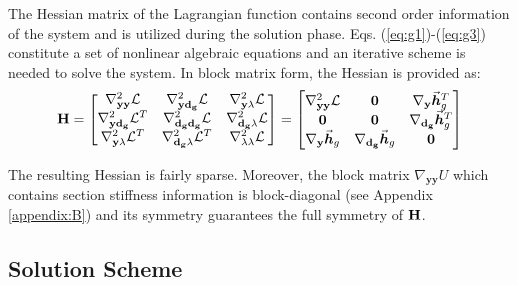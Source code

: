 The Hessian matrix of the Lagrangian function contains second order
information of the system and is utilized during the solution phase.
Eqs. (\ref{eq:g1})-(\ref{eq:g3}) constitute a set of nonlinear algebraic
equations and an iterative scheme is needed to solve the system. In block
matrix form, the Hessian is provided as:
\begin{gather}
	\mathbf{H} = \begin{bmatrix}
		\nabla^2_{\mathbf{yy}}\mathcal{L} & \nabla^2_{\mathbf{y d_g}}\mathcal{L}
		&\nabla^2_{\mathbf{y\lambda}}\mathcal{L} \\
		\nabla^2_{\mathbf{y d_g}}\mathcal{L}^T  & 
		\nabla^2_{\mathbf{d_gd_g}}\mathcal{L} &
		\nabla^2_{\mathbf{d_g\lambda}}\mathcal{L}\\
		\nabla^2_{\mathbf{y\lambda}}\mathcal{L}^T
		&\nabla^2_{\mathbf{d_g\lambda}}\mathcal{L}^T
		&\nabla^2_{\mathbf{\lambda\lambda}}\mathcal{L}
	\end{bmatrix} = \begin{bmatrix}
		\nabla^2_{\mathbf{yy}}\mathcal{L} & \mathbf{0} & 
		\nabla_{\mathbf{y}}\vec{\bm{h}}^T_g\\
		\mathbf{0} & \mathbf{0} & \nabla_{\mathbf{d_g}}\vec{\bm{h}}^T_g\\
		\nabla_{\mathbf{y}}\vec{\bm{h}}_g & \nabla_{\mathbf{d_g}}\vec{\bm{h}}_g & 
		\mathbf{0}\\
	\end{bmatrix}
	\label{eq:hess}
\end{gather}

\noindent The resulting Hessian is fairly sparse. Moreover, the block
matrix $\nabla_{\mathbf{yy}}U$ which contains section stiffness information is
block-diagonal (see Appendix \ref{appendix:B}) and its
symmetry guarantees the full symmetry of $\mathbf{H}$.

\subsection{Solution Scheme}\label{subsection:CH2-S4SS3}

